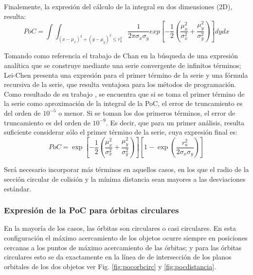 {Finalemente, la expresi\'on del c\'alculo de la integral en dos dimensiones (2D), resulta:\\

\begin{equation}
 PoC=\int \int_{(x-\mu_{x})^{2}+(y-\mu_{y})^{2}\leq r_{a}^{2}} \frac{1}{2\pi\sigma_{x}\sigma_{y}} exp [-\frac{1}{2}(\frac{\mu_{x}^{2}}{\sigma_{x}^{2}}+\frac{\mu_{y}^{2}}{\sigma_{y}^{2}}) ] dy dx
 \label{eq:pocintegral}
\end{equation}

Tomando como referencia el trabajo de Chan \citep{chan2003improved} en la b\'usqueda de una expresi\'on anal\'itica que se construye mediante una serie convergente de infinitos t\'erminos; Lei-Chen presenta una expresi\'on para el primer t\'ermino de la serie y una f\'ormula recursiva de la serie, que resulta ventajosa para los m\'etodos de programaci\'on.\\

Como resultado de su trabajo \citep{lei2009rapid}, se encuentra que si se toma el primer t\'ermino de la serie como aproximaci\'on de la integral de la PoC,  el error de truncamiento es del orden de $10^{-5}$ o menor. Si se toman los dos primeros t\'erminos, el error de truncamiento es del orden de $10^{-9}$. Es decir, que para un primer an\'alisis, resulta suficiente considerar s\'olo el primer t\'ermino de la serie, cuya expresi\'on final es:\\


\begin{equation}
 PoC= \exp[-\frac{1}{2}(\frac{\mu_{x}^{2}}{\sigma_{x}^{2}}+\frac{\mu_{y}^{2}}{\sigma_{y}^{2}})][1-\exp(\frac{r_{a}^{2}}{2\sigma_{x}\sigma_{y}})]
 \label{eq:pocexpress}
\end{equation}

Ser\'a necesario incorporar m\'as t\'erminos en aquellos casos, en los que el radio de la secci\'on circular de colisi\'on y la m\'inima distancia sean mayores a las desviaciones est\'andar.

\subsubsection*{Expresi\'on de la PoC para \'orbitas circulares}

En la mayor\'ia de los casos, las \'orbitas son circulares o casi circulares. En esta configuraci\'on el m\'aximo acercamiento de los objetos ocurre siempre en posiciones cercanas a los puntos de m\'aximo acercamiento de las \'orbitas; y para las \'orbitas circulares esto se da exactamente en la l\'inea de de intersecci\'on de los planos orbitales de los dos objetos ver Fig. \ref{fig:pocorbcirc} y \ref{fig:pocdistancia}.\\

}
